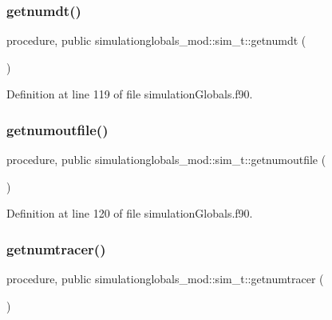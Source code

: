 \subsubsection{\texorpdfstring{getnumdt()}{getnumdt()}}
{\footnotesize\ttfamily procedure, public simulationglobals\+\_\+mod\+::sim\+\_\+t\+::getnumdt (\begin{DoxyParamCaption}{ }\end{DoxyParamCaption})}



Definition at line 119 of file simulation\+Globals.\+f90.

\mbox{\label{structsimulationglobals__mod_1_1sim__t_abdb9a18d07e725c9c99423978f014c4c}} 
\subsubsection{\texorpdfstring{getnumoutfile()}{getnumoutfile()}}
{\footnotesize\ttfamily procedure, public simulationglobals\+\_\+mod\+::sim\+\_\+t\+::getnumoutfile (\begin{DoxyParamCaption}{ }\end{DoxyParamCaption})}



Definition at line 120 of file simulation\+Globals.\+f90.

\mbox{\label{structsimulationglobals__mod_1_1sim__t_af581a3f3854589b767c95bf4b3d3a388}} 
\subsubsection{\texorpdfstring{getnumtracer()}{getnumtracer()}}
{\footnotesize\ttfamily procedure, public simulationglobals\+\_\+mod\+::sim\+\_\+t\+::getnumtracer (\begin{DoxyParamCaption}{ }\end{DoxyParamCaption})}



